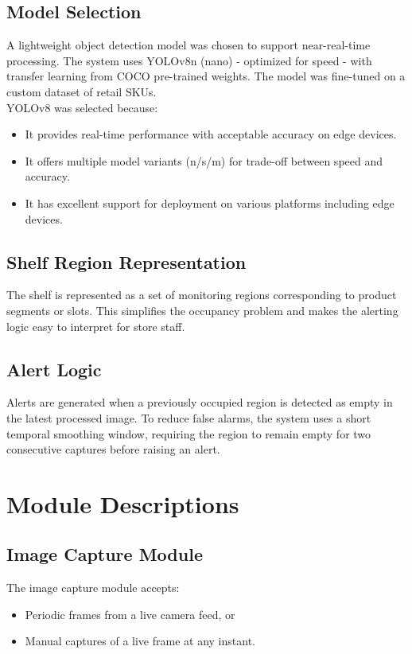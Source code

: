 \subsection{Model Selection}

A lightweight object detection model was chosen to support near-real-time processing. The system uses YOLOv8n (nano) - optimized for speed - with transfer learning from COCO pre-trained weights. The model was fine-tuned on a custom dataset of retail SKUs.
\\
YOLOv8 was selected because:
\begin{itemize}
    \item It provides real-time performance with acceptable accuracy on edge devices.
    \item It offers multiple model variants (n/s/m) for trade-off between speed and accuracy.
    \item It has excellent support for deployment on various platforms including edge devices.
\end{itemize}

\subsection{Shelf Region Representation}

The shelf is represented as a set of monitoring regions corresponding to product segments or slots. This simplifies the occupancy problem and makes the alerting logic easy to interpret for store staff.

\subsection{Alert Logic}

Alerts are generated when a previously occupied region is detected as empty in the latest processed image. To reduce false alarms, the system uses a short temporal smoothing window, requiring the region to remain empty for two consecutive captures before raising an alert.

\section{Module Descriptions}

\subsection{Image Capture Module}

The image capture module accepts:
\begin{itemize}
    \item Periodic frames from a live camera feed, or
    \item Manual captures of a live frame at any instant.
\end{itemize}

